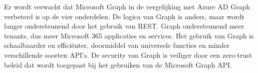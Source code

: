\begin{comment}

Hier beschrijf je welke resultaten je verwacht. Als je metingen en simulaties uitvoert, kan je hier al mock-ups maken van de grafieken samen met de verwachte conclusies. Benoem zeker al je assen en de onderdelen van de grafiek die je gaat gebruiken. Dit zorgt ervoor dat je concreet weet welk soort data je moet verzamelen en hoe je die moet meten.

Wat heeft de doelgroep van je onderzoek aan het resultaat? Op welke manier zorgt jouw bachelorproef voor een meerwaarde?

Hier beschrijf je wat je verwacht uit je onderzoek, met de motivatie waarom. Het is \textbf{niet} erg indien uit je onderzoek andere resultaten en conclusies vloeien dan dat je hier beschrijft: het is dan juist interessant om te onderzoeken waarom jouw hypothesen niet overeenkomen met de resultaten.



Er wordt verwacht dat alle niet Microsoft-\newline{}gerelateerde Infrastructure Automation tools de nodige Azure configuraties kunnen opzetten voor een testomgeving. Hoewel Ansible en Terraform een opmerkelijk beter potentieel hebben ten opzichte van de andere tools. Dit gaat gepaard met meer mogelijkheden binnen Azure. In vergelijking met de andere tools, zitten Ansible en Terraform in een continue ontwikkelingscyclus door het jonge toetreden tot de IT-sector. Beide tools scoren goed op vlak van logica, leesbaarheid, documentatie, community en limieten. In tegenstelling tot de andere tools die eerder op vlak van verwerkingssnelheid domineren. 

Vervolgens wordt er uit het onderzoek verwacht dat het automatiseren van Azure configuraties alleen maar voordelen heeft. Het enige nadeel in verband met de Infrastructure Automation tools is het leerproces om de tools onder de knie te hebben. Toch wordt dit ook als een voordeel gezien, omwille de tools buiten Azure populair zijn en ondersteund worden. Door het gebruik van deze automatisatie wordt de efficiëntie aanzienlijk verhoogd. Vervolgens biedt het de mogelijkheid tot Disaster Recovery aan. Daarbovenop is de kans tot menselijke fouten opmerkelijk verkleind.

\end{comment}

Er wordt verwacht dat Microsoft Graph in de vergelijking met Azure AD Graph verbeterd is op de vier onderdelen. De logica van Graph is anders, maar wordt langer ondersteunend door het gebruik van REST. Graph ondersteunend meer tenants, dus meer Microsoft 365 applicaties en services. Het gebruik van Graph is schaalbaarder en efficiënter, doormiddel van universele functies en minder verschillende soorten API’s. De security van Graph is veiliger door een zero-trust beleid dat wordt toegepast bij het gebruiken van de Microsoft Graph API.

